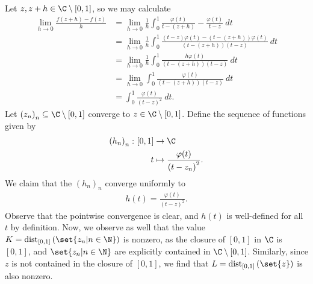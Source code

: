 \documentclass[10pt]{mypackage}
\begin{document}
\begin{solution}
  Let $ z,z+h\in \C\setminus \left[ 0,1 \right] $, so we may calculate
  \begin{align*}
    \lim_{h\rightarrow 0} \frac{f\left( z+h \right) - f\left( z \right)}{h} &= \lim_{h\rightarrow 0} \frac{1}{h} \int_{0}^{1} \frac{\varphi(t)}{t-\left( z+h \right)} - \frac{\varphi(t)}{t-z}\:dt\\
                                                                            &= \lim_{h\rightarrow 0} \frac{1}{h} \int_{0}^{1} \frac{\left( t-z \right)\varphi(t) - \left( t-\left( z+h \right) \right)\varphi(t)}{\left( t-\left( z+h \right) \right)\left( t-z \right)} \:dt\\
                                                                            &= \lim_{h\rightarrow 0} \frac{1}{h} \int_{0}^{1} \frac{h\varphi(t)}{\left( t-\left( z+h \right) \right)\left( t-z \right)}\:dt\\
                                                                            &= \lim_{h\rightarrow 0} \int_{0}^{1} \frac{\varphi\left( t \right)}{\left( t-\left( z+h \right) \right)\left( t-z \right)}\:dt\\
                                                                            &= \int_{0}^{1} \frac{\varphi(t)}{\left( t-z \right)^2}\:dt.
  \end{align*}
  Let $\left( z_n \right)_n\subseteq \C\setminus \left[ 0,1 \right]$ converge to $z\in \C\setminus \left[ 0,1 \right]$. Define the sequence of functions given by
  \begin{align*}
    \left( h_n \right)_n\colon [0,1]&\rightarrow \C\\
    t &\mapsto \frac{\varphi(t)}{\left( t-z_n \right)^2}.
  \end{align*}
  We claim that the $\left( h_n \right)_n$ converge uniformly to 
  \begin{align*}
    h(t) = \frac{\varphi(t)}{\left( t-z \right)^2}. 
  \end{align*}
  Observe that the pointwise convergence is clear, and $h(t)$ is well-defined for all $t$ by definition. Now, we observe as well that the value $K = \operatorname{dist}_{[0,1]} \left( \set{z_n | n\in\N} \right)$ is nonzero, as the closure of $ \left[ 0,1 \right] $ in $\C$ is $\left[ 0,1 \right]$, and $\set{z_n | n\in \N}$ are explicitly contained in $\C\setminus\left[ 0,1 \right]$. Similarly, since $z$ is not contained in the closure of $ \left[ 0,1 \right] $, we find that $ L = \operatorname{dist}_{[0,1]}\left( \set{z} \right) $ is also nonzero. \newline


\end{solution}
\end{document}

